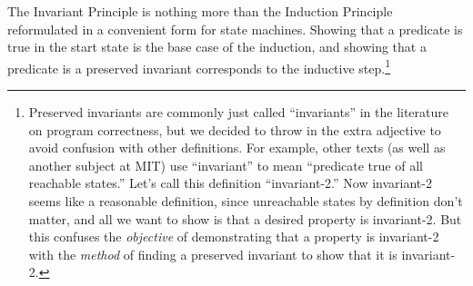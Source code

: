 
The Invariant Principle is nothing more than the Induction Principle
reformulated in a convenient form for state machines.  Showing that a
predicate is true in the start state is the base case of the
induction, and showing that a predicate is a preserved invariant
corresponds to the inductive step.\footnote{Preserved invariants are
  commonly just called ``invariants'' in the literature on program
  correctness, but we decided to throw in the extra adjective to avoid
  confusion with other definitions.  For example, other texts (as well
  as another subject at MIT) use ``invariant'' to mean ``predicate
  true of all reachable states.''  Let's call this definition
  ``invariant-2.''  Now invariant-2 seems like a reasonable
  definition, since unreachable states by definition don't matter, and
  all we want to show is that a desired property is invariant-2.  But
  this confuses the \emph{objective} of demonstrating that a property
  is invariant-2 with the \emph{method} of finding a preserved
  invariant to show that it is invariant-2.}


